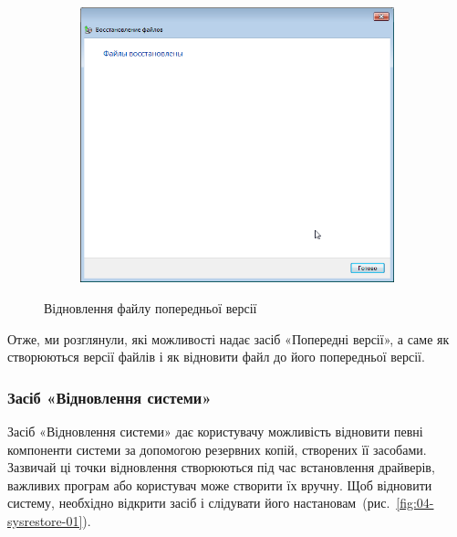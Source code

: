\documentclass[
	a4paper,
	oneside,
	BCOR = 10mm,
	DIV = 12,
	12pt,
	headings = normal,
]{scrartcl}
\newlength{\gridunitwidth}
\begin{document}
\begin{figure}[!htbp]
\begin{subfigure}[b]{5\gridunitwidth}
						\caption{}
						\label{subfig:03-previous-versions-01-02}
					\end{subfigure}

					\begin{subfigure}[b]{7\gridunitwidth}
						\includegraphics[width=\columnwidth]{./assets/y04s01-infosec-lab-01-03-p15.png}
						\caption{}
						\label{subfig:03-previous-versions-01-03}
					\end{subfigure}
					\caption{Відновлення файлу попередньої версії}
					\label{fig:03-previous-versions-01}
				\end{figure}

				Отже, ми розглянули, які можливості надає засіб «Попередні версії», а саме як створюються версії файлів і як відновити файл до його попередньої версії.

			\subsubsection{Засіб «Відновлення системи»}
				Засіб «Відновлення системи» дає користувачу можливість відновити певні компоненти системи за допомогою резервних копій, створених її засобами. Зазвичай ці точки відновлення створюються під час встановлення драйверів, важливих програм або користувач може створити їх вручну. Щоб відновити систему, необхідно відкрити засіб і слідувати його настановам~(рис.~\ref{fig:04-sysrestore-01}).
\end{document}
